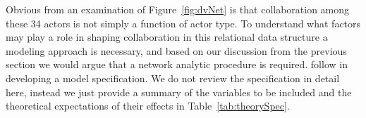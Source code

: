 \documentclass[12pt,onesided,pdflatex]{amsart}
\begin{document}
Obvious from an examination of Figure~\ref{fig:dvNet} is that collaboration among these 34 actors is not simply a function of actor type. To understand what factors may play a role in shaping collaboration in this relational data structure a modeling approach is necessary, and based on our discussion from the previous section we would argue that a network analytic procedure is required. \citet{cranmer:etal:2016} follow \citet{ingold:fischer:2014} in developing a model specification. We do not review the specification in detail here, instead we just provide a summary of the variables to be included and the theoretical expectations of their effects in Table~\ref{tab:theorySpec}. 
\end{document}
